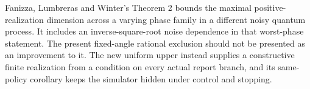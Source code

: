 Fanizza, Lumbreras and Winter's Theorem 2 \cite{Fanizza24} bounds the maximal positive-realization dimension across a varying phase family in a different noisy quantum process. It includes an inverse-square-root noise dependence in that worst-phase statement. The present fixed-angle rational exclusion should not be presented as an improvement to it. The new uniform upper instead supplies a constructive finite realization from a condition on every actual report branch, and its same-policy corollary keeps the simulator hidden under control and stopping.
